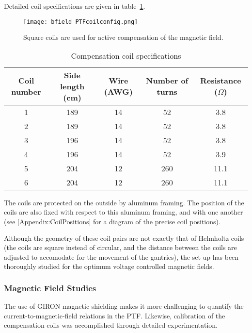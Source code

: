 Detailed coil specifications are given in table~\ref{tab:coil_specs}.
%
\begin{figure}[h]
  \begin{center}
  \texttt{[image: bfield\_PTFcoilconfig.png]}
  \caption{Square coils are used for active compensation of the magnetic field.}
  \label{fig:coils}
  \end{center}
\end{figure}
%
\begin{table}[h]
\begin{center}
  \begin{tabular}{|c|c c c c|}
    \hline
    Coil number & Side length (cm) & Wire (AWG) & Number of turns & Resistance ($\Omega$)\\
    \hline\hline
    1 & 189 & 14 & 52 & 3.8 \\
    2 & 189 & 14 & 52 & 3.8 \\
    3 & 196 & 14 & 52 & 3.8 \\
    4 & 196 & 14 & 52 & 3.9 \\
    5 & 204 & 12 & 260 & 11.1 \\
    6 & 204 & 12 & 260 & 11.1 \\
    \hline
  \end{tabular}
\end{center}
\caption{Compensation coil specifications}
\label{tab:coil_specs}
\end{table}
%
The coils are protected on the outside by aluminum framing. The position of the coils are also fixed with respect to this aluminum framing, and with one another (see \ref{Appendix:CoilPositions} for a diagram of the precise coil positions).

Although the geometry of these coil pairs are not exactly that of Helmholtz coils (the coils are square instead of circular, and the distance between the coils are adjusted to accomodate for the movement of the gantries), the set-up has been thoroughly studied for the optimum voltage controlled magnetic fields.

\subsubsection{Magnetic Field Studies}

The use of GIRON magnetic shielding makes it more challenging to quantify the current-to-magnetic-field relations in the PTF. Likewise, calibration of the compensation coils was accomplished through detailed experimentation.

